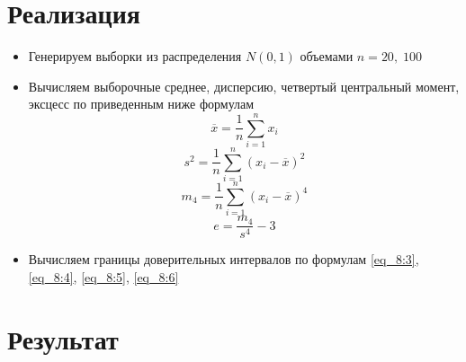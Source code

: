 \documentclass[12pt]{article}
\begin{document}
\section*{Реализация}
\begin{itemize}
    \item Генерируем выборки из распределения $N(0, 1)$ объемами $n = 20, \; 100$
    \item Вычисляем выборочные среднее, дисперсию, четвертый центральный момент, эксцесс по приведенным ниже формулам
        \begin{equation}
            \overline{x} = \frac{1}{n} \sum_{i=1}^{n} x_i
            \label{eq_8:7}
        \end{equation}
        \begin{equation}
            s^2 = \frac{1}{n} \sum_{i=1}^{n} (x_i - \overline{x})^2
            \label{eq_8:8}
        \end{equation}
        \begin{equation}
            m_4 = \frac{1}{n} \sum_{i=1}^{n} (x_i - \overline{x})^4
            \label{eq_8:9}
        \end{equation}
        \begin{equation}
            e = \frac{m_4}{s^4} - 3 
            \label{eq_8:10}
        \end{equation}
    \item Вычисляем границы доверительных интервалов по формулам \eqref{eq_8:3}, \eqref{eq_8:4}, \eqref{eq_8:5}, \eqref{eq_8:6}

\end{itemize}


\newpage
\section*{Результат}
\end{document}
